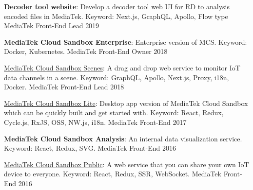 \begin{cvhonors}
  \cvhonor
    {\textbf{Decoder tool website}: \textmd{Develop a decoder tool web UI for RD to analysis encoded files in MediaTek. Keyword: Next.js, GraphQL, Apollo, Flow type}} %
    {MediaTek} %
    {Front-End Lead} %
    {2019} %

  \cvhonor
    {\textbf{MediaTek Cloud Sandbox Enterprise}: \textmd{Enterprise version of MCS. Keyword: Docker, Kubernetes.}} %
    {MediaTek} %
    {Front-End Owner} %
    {2018} %

  \cvhonor
    {\href{https://medium.com/mediatekcloudsandbox/\%E5\%A6\%82\%E4\%BD\%95\%E9\%80\%8F\%E9\%81\%8E-scene-\%E5\%A0\%B4\%E6\%99\%AF-\%E5\%8A\%9F\%E8\%83\%BD\%E5\%BF\%AB\%E9\%80\%9F\%E6\%89\%93\%E9\%80\%A0\%E7\%89\%A9\%E8\%81\%AF\%E7\%B6\%B2\%E6\%87\%89\%E7\%94\%A8-1-d10d0d687742}{MediaTek Cloud Sandbox Scenes}: \textmd{A drag and drop web service to monitor IoT data channels in a scene. Keyword: GraphQL, Apollo, Next.js, Proxy, i18n, Docker.}} %
    {MediaTek} %
    {Front-End Lead} %
    {2018} %

  \cvhonor
    {\href{https://mcslite.netlify.com/}{MediaTek Cloud Sandbox Lite}: \textmd{Desktop app version of MediaTek Cloud Sandbox which can be quickly built and get started with. Keyword: React, Redux, Cycle.js, RxJS, OSS, NW.js, i18n.}} %
    {MediaTek} %
    {Front-End} %
    {2017} %

  \cvhonor
    {\textbf{MediaTek Cloud Sandbox Analysis}: \textmd{An internal data visualization service. Keyword: React, Redux, SVG.}} %
    {MediaTek} %
    {Front-End} %
    {2016} %

  \cvhonor
    {\href{https://medium.com/mediatekcloudsandbox/\%E5\%B0\%87\%E6\%82\%A8\%E7\%9A\%84\%E8\%A3\%9D\%E7\%BD\%AE\%E8\%A8\%AD\%E7\%82\%BA\%E5\%85\%AC\%E9\%96\%8B\%E4\%B8\%A6\%E5\%88\%86\%E4\%BA\%AB\%E7\%B5\%A6\%E4\%BB\%BB\%E4\%BD\%95\%E4\%BA\%BA\%E7\%80\%8F\%E8\%A6\%BD-a96d47ba5859}{MediaTek Cloud Sandbox Public}: \textmd{A web service that you can share your own IoT device to everyone. Keyword: React, Redux, SSR, WebSocket.}} %
    {MediaTek} %
    {Front-End} %
    {2016} %


\end{cvhonors}
